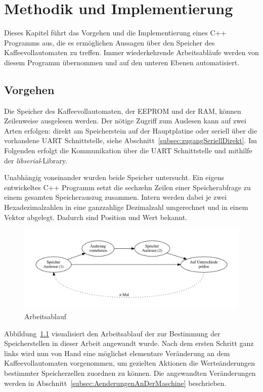 \chapter{Methodik und Implementierung}
Dieses Kapitel führt das Vorgehen und die Implementierung eines C++ Programms aus, die es ermöglichen Aussagen über den Speicher des Kaffeevollautomaten zu treffen.
Immer wiederkehrende Arbeitsabläufe werden von diesem Programm übernommen und auf den unteren Ebenen automatisiert.

\section{Vorgehen}
Die Speicher des Kaffeevollautomaten, der \ac{EEPROM} und der \ac{RAM}, können Zeilenweise ausgelesen werden.
Der nötige Zugriff zum Auslesen kann auf zwei Arten erfolgen: direkt am Speicherstein auf der Hauptplatine oder seriell über die vorhandene \ac{UART} Schnittstelle, siehe Abschnitt~\ref{subsec:zugangSeriellDirekt}.
Im Folgenden erfolgt die Kommunikation über die \ac{UART} Schnittstelle und mithilfe der \textit{libserial}-Library.

Unabhängig voneinander wurden beide Speicher untersucht.
Ein eigens entwickeltes C++ Programm setzt die sechzehn Zeilen einer Speicherabfrage zu einem gesamten Speicherauszug zusammen.
Intern werden dabei je zwei Hexadezimalzahlen in eine ganzzahlige Dezimalzahl umgerechnet und in einem Vektor abgelegt.
Dadurch sind Position und Wert bekannt.

\begin{figure}
  \begin{center}
    \includegraphics[scale=0.54]{images/chapter_4/workflow}
    \caption{Arbeitsablauf}
    \label{fig:workflow}
  \end{center}
\end{figure}

Abbildung~\ref{fig:workflow} visualisiert den Arbeitsablauf der zur Bestimmung der Speicherstellen in dieser Arbeit angewandt wurde.
Nach dem ersten Schritt ganz links wird nun von Hand eine möglichst elementare Veränderung an dem Kaffeevollautomaten vorgenommen, um gezielten Aktionen die Werteänderungen bestimmter Speicherzellen zuordnen zu können.
Die angewandten Veränderungen werden in Abschnitt~\ref{subsec:AenderungenAnDerMaschine} beschrieben.

